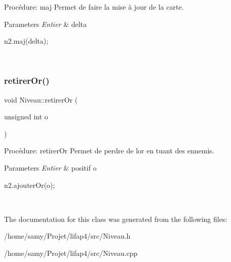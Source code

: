 Procédure\+: maj Permet de faire la mise à jour de la carte. 


\begin{DoxyParams}{Parameters}
{\em Entier} & delta 
\begin{DoxyCode}
n2.maj(delta);
\end{DoxyCode}
 \\
\hline
\end{DoxyParams}
\mbox{\label{classNiveau_a3192b7514716cfddac9ff465f9ad1f2f}} 
\subsubsection{\texorpdfstring{retirer\+Or()}{retirerOr()}}
{\footnotesize\ttfamily void Niveau\+::retirer\+Or (\begin{DoxyParamCaption}\item[{unsigned int}]{o }\end{DoxyParamCaption})}



Procédure\+: retirer\+Or Permet de perdre de l\textquotesingle{}or en tuant des ennemis. 


\begin{DoxyParams}{Parameters}
{\em Entier} & positif o 
\begin{DoxyCode}
n2.ajouterOr(o);
\end{DoxyCode}
 \\
\hline
\end{DoxyParams}


The documentation for this class was generated from the following files\+:\begin{DoxyCompactItemize}
\item 
/home/samy/\+Projet/lifap4/src/Niveau.\+h\item 
/home/samy/\+Projet/lifap4/src/Niveau.\+cpp\end{DoxyCompactItemize}
